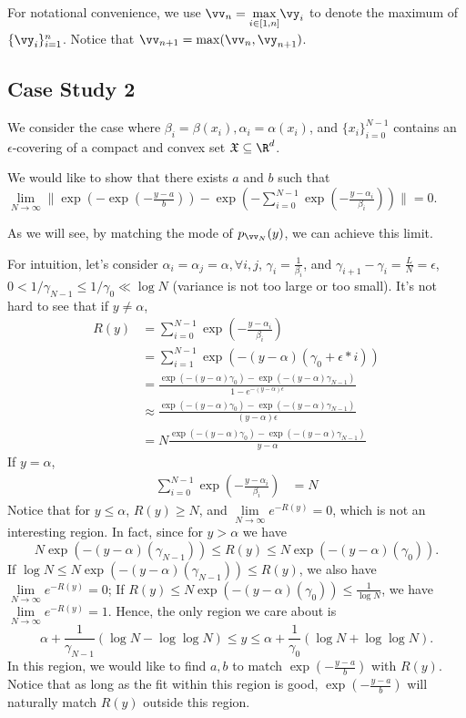 For notational convenience, we  use $\vv_n = \underset{i\in[1,n]}{\max} \vy_i$ to denote the maximum of $\{\vy_i\}_{i=1}^n$. Notice that $\vv_{n+1} = \max(\vv_n,\vy_{n+1}) $.

\subsection{Case Study 2}
We consider the case where $\beta_i = \beta(x_i), \alpha_i = \alpha(x_i)$, and $\{x_i\}_{i=0}^{N-1}$ contains an $\epsilon$-covering of a compact and convex set $\mathfrak X\subseteq \R^d$.  %

We would like to show that there exists $a$ and $b$ such that 
$\underset{N\rightarrow\infty}{\lim}\|\exp\left(-\exp(-\frac{y-a}{b})\right) - \exp\left(-\sum_{i=0}^{N-1}\exp(-\frac{y-\alpha_i}{\beta_i}) \right)\| =0 $.

As we will see, by matching the mode of $p_{\vv_N}(y)$, we can achieve this limit. %

For intuition, let's consider $\alpha_i=\alpha_j=\alpha, \forall i,j$, $\gamma_i = \frac{1}{\beta_i}$, and $\gamma_{i+1}-\gamma_i = \frac{L}{N}=\epsilon$, $0<1/\gamma_{N-1}\leq 1/\gamma_{0}\ll \log N$ (variance is not too large or too small).
It's not hard to see that if $y\neq \alpha$,
\begin{align}
R(y)&=\sum_{i=0}^{N-1}\exp(-\frac{y-\alpha_i}{\beta_i}) \\
&= \sum_{i=1}^{N-1}\exp(-(y-\alpha)(\gamma_0+\epsilon*i)) \\
&= \frac{\exp{(-(y-\alpha)\gamma_0)} - \exp{(-(y-\alpha)\gamma_{N-1})}}{1-e^{-(y-\alpha)\epsilon}}\\
&\approx \frac{\exp{(-(y-\alpha)\gamma_0)} - \exp{(-(y-\alpha)\gamma_{N-1})}}{(y-\alpha)\epsilon}\\
&=N \frac{\exp{(-(y-\alpha)\gamma_0)} - \exp{(-(y-\alpha)\gamma_{N-1})}}{y-\alpha}
\end{align}
If $y=\alpha$,
\begin{align}
\sum_{i=0}^{N-1}\exp(-\frac{y-\alpha_i}{\beta_i}) &= N
\end{align}
Notice that for $y \leq \alpha$, $R(y)\geq N$, and $\underset{N\rightarrow\infty}{\lim} e^{-R(y)} = 0$, which is not an interesting region. In fact, since for $y > \alpha$ we have 
$$ N\exp(-(y-\alpha)(\gamma_{N-1})) \leq R(y) \leq N\exp(-(y-\alpha)(\gamma_0)).$$ 
If $\log N \leq N\exp(-(y-\alpha)(\gamma_{N-1})) \leq R(y)$, we also have $\underset{N\rightarrow\infty}{\lim} e^{-R(y)} = 0$; If $R(y) \leq N\exp(-(y-\alpha)(\gamma_0)) \leq \frac1{\log N}$, we have $\underset{N\rightarrow\infty}{\lim} e^{-R(y)} = 1$. Hence, the only region we care about is 
$$\alpha + \frac{1}{\gamma_{N-1}}(\log N-\log\log N) \leq y \leq \alpha + \frac{1}{\gamma_0}(\log N+\log\log N). $$
In this region, we would like to find $a, b$ to match $\exp(-\frac{y-a}{b})$ with $R(y)$. Notice that as long as the fit within this region is good, $\exp(-\frac{y-a}{b})$ will naturally match $R(y)$ outside this region. 


